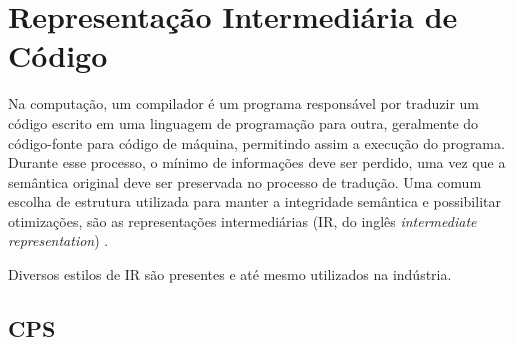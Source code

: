 \chapter{Representação Intermediária de Código}\label{ch:IR}

Na computação, um compilador é um programa responsável por traduzir um código escrito em uma linguagem de programação para outra, geralmente do código-fonte para código de máquina, permitindo assim a execução do programa.
Durante esse processo, o mínimo de informações deve ser perdido, uma vez que a semântica original deve ser preservada no processo de tradução.
Uma comum escolha de estrutura utilizada para manter a integridade semântica e possibilitar otimizações, são as representações intermediárias (IR, do inglês \textit{intermediate representation}) \cite{cooper2014}.

Diversos estilos de IR são presentes e até mesmo utilizados na indústria.






\section{CPS}\label{sec:cps}










